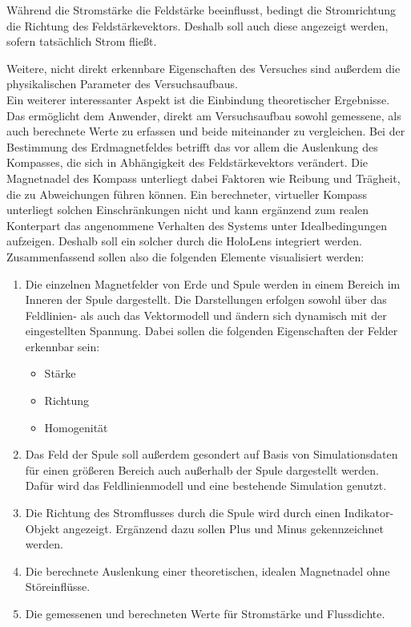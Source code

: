 Während die Stromstärke die Feldstärke beeinflusst, bedingt die Stromrichtung die Richtung des Feldstärkevektors. Deshalb soll auch diese angezeigt werden, sofern tatsächlich Strom fließt.

 Weitere, nicht direkt erkennbare Eigenschaften des Versuches sind außerdem die physikalischen Parameter des Versuchsaufbaus.\\

Ein weiterer interessanter Aspekt ist die Einbindung theoretischer Ergebnisse. Das ermöglicht dem Anwender, direkt am Versuchsaufbau sowohl gemessene, als auch berechnete Werte zu erfassen und beide miteinander zu vergleichen. Bei der Bestimmung des Erdmagnetfeldes betrifft das vor allem die Auslenkung des Kompasses, die sich in Abhängigkeit des Feldstärkevektors verändert. Die Magnetnadel des Kompass unterliegt dabei Faktoren wie Reibung und Trägheit, die zu Abweichungen führen können. Ein berechneter, virtueller Kompass unterliegt solchen Einschränkungen nicht und kann ergänzend zum realen Konterpart das angenommene Verhalten des Systems unter Idealbedingungen aufzeigen. Deshalb soll ein solcher durch die HoloLens integriert werden.\\

Zusammenfassend sollen also die folgenden Elemente visualisiert werden:
\begin{enumerate}
	\item Die einzelnen Magnetfelder von Erde und Spule werden in einem Bereich im Inneren der Spule dargestellt. Die Darstellungen erfolgen sowohl über das Feldlinien- als auch das Vektormodell und ändern sich dynamisch mit der eingestellten Spannung. Dabei sollen die folgenden Eigenschaften der Felder erkennbar sein:
	\begin{itemize}[topsep=-0.25em]
		\setlength{\itemsep}{-0.25em}
		\item Stärke
		\item Richtung
		\item Homogenität
	\end{itemize}
	\item Das Feld der Spule soll außerdem gesondert auf Basis von Simulationsdaten für einen größeren Bereich auch außerhalb der Spule dargestellt werden. Dafür wird das Feldlinienmodell und eine bestehende Simulation genutzt.
	\item Die Richtung des Stromflusses durch die Spule wird durch einen Indikator-Objekt angezeigt. Ergänzend dazu sollen Plus und Minus gekennzeichnet werden.
	\item Die berechnete Auslenkung einer theoretischen, idealen Magnetnadel ohne Störeinflüsse. 
	\item Die gemessenen und berechneten Werte für Stromstärke und Flussdichte.
\end{enumerate}
\vspace{6px}

